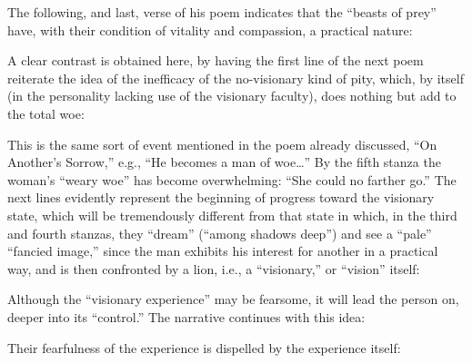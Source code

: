 The following, and last, verse of his poem indicates that the \enquote{beasts of prey} have, with their
condition of vitality and compassion, a practical nature:


A clear contrast is obtained here, by having the first line of the next poem reiterate the idea of the inefficacy of the
no-visionary kind of pity, which, by itself (in the personality lacking use of the visionary faculty), does nothing but add to the total woe:


This is the same sort of event mentioned in the poem already discussed, \enquote{On Another's Sorrow,} e.g., \enquote{He becomes
a man of woe\dots} By the fifth stanza the woman's \enquote{weary woe} has become overwhelming: \enquote{She could no farther go.}
The next lines evidently represent the beginning of progress toward the visionary state, which will be tremendously different from
that state in which, in the third and fourth stanzas, they \enquote{dream} (\enquote{among shadows deep}) and see a \enquote{pale} \enquote{fancied image,} since
the man exhibits his interest for another in a practical way, and is then confronted by a lion, i.e., a \enquote{visionary,} or \enquote{vision} itself:


Although the \enquote{visionary experience} may be fearsome, it will lead the person on, deeper into its \enquote{control.} The narrative
continues with this idea:


Their fearfulness of the experience is dispelled by the experience itself:

